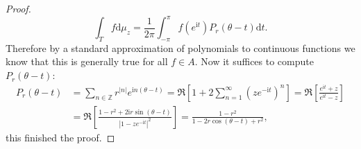 \begin{proof}
$$
\int_T{f\mathrm{d}\mu _z}=\frac{1}{2\pi}\int_{-\pi}^{\pi}{f\left( e^{\mathrm{i}t} \right) P_r\left( \theta -t \right) \mathrm{d}t}.
$$
Therefore by a standard approximation of polynomials to continuous functions we know that this is generally true for all $f\in A$. Now it suffices to compute $P_r(\theta-t)$: 
$$
\begin{aligned}
P_r\left( \theta -t \right) &=\sum_{n\in \mathbb{Z}}{r^{\left| n \right|}e^{\mathrm{i}n\left( \theta -t \right)}}=\Re \left[ 1+2\sum_{n=1}^{\infty}{\left( ze^{-\mathrm{i}t} \right) ^n} \right] =\Re \left[ \frac{e^{\mathrm{i}t}+z}{e^{\mathrm{i}t}-z} \right] 
\\
&=\Re \left[ \frac{1-r^2+2\mathrm{i}r\sin \left( \theta -t \right)}{\left| 1-ze^{-\mathrm{i}t} \right|^2} \right] =\frac{1-r^2}{1-2r\cos \left( \theta -t \right) +r^2},
\end{aligned}
$$
this finished the proof.
\end{proof}
